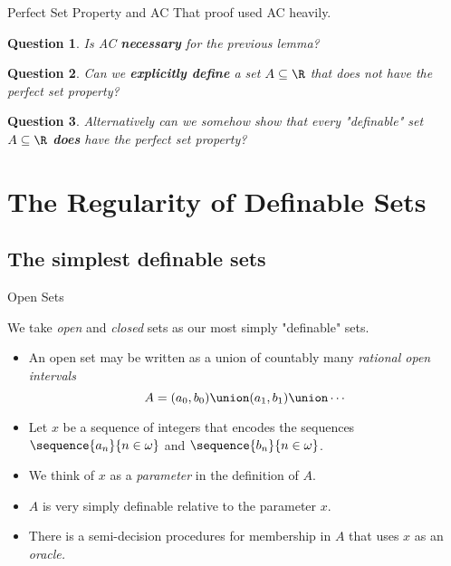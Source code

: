 \documentclass{beamer}
\newtheorem*{question}{Question}
\begin{document}
\begin{frame}{Perfect Set Property and AC}
That proof used AC heavily.

\begin{question}
Is AC \textbf{necessary} for the previous lemma?
\end{question}

\begin{question}
Can we \textbf{explicitly define} a set $A\subseteq \R$ that does not have the perfect set property?
\end{question}

\begin{question}
 Alternatively can we somehow show that every "definable" set
$A\subseteq \R$ \textbf{does} have the perfect set property?
\end{question}

\end{frame}

\section{The Regularity of Definable Sets}

\subsection{The simplest definable sets}

\begin{frame}{Open Sets}

We take \emph{open} and \emph{closed} sets as our most simply "definable" sets.

\pause

\begin{itemize}
  \item An open set may be written as a union of countably many
  \emph{rational open intervals}
  $$A = (a_0, b_0) \union (a_1, b_1) \union \cdots$$
  \item Let $x$ be a sequence of integers that encodes the sequences
  $\sequence{a_n}{n\in\omega}$ and $\sequence{b_n}{n\in\omega}$.
  \item We think of $x$ as a \emph{parameter} in the definition
  of $A$.
  \item $A$ is very simply definable relative to the parameter $x$.
  \item There is a semi-decision procedures for membership in $A$ that
  uses $x$ as an \emph{oracle.}
\end{itemize}

\end{frame}
\end{document}
